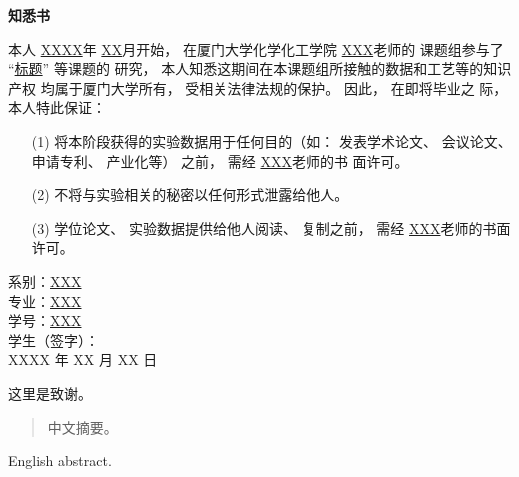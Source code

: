 \documentclass{xmu}
\begin{document}
\vspace*{-2.45em}
\pagestyle{plain}
\begin{center}
    \bf\songti{}知\quad 悉\quad 书
\end{center}
\vspace{1.5em}
{
    \renewcommand{\baselinestretch}{2}
    \par 
本人 \underline{XXXX}年 \underline{XX}月开始， 在厦门大学化学化工学院 \underline{XXX}老师的
课题组参与了 “\underline{标题}” 等课题的
研究， 本人知悉这期间在本课题组所接触的数据和工艺等的知识产权
均属于厦门大学所有， 受相关法律法规的保护。 因此， 在即将毕业之
际， 本人特此保证：
\begin{enumerate}
    \item [(1)]将本阶段获得的实验数据用于任何目的（如： 发表学术论文、
    会议论文、 申请专利、 产业化等） 之前， 需经 \underline{XXX}老师的书
    面许可。
    \item [(2)]不将与实验相关的秘密以任何形式泄露给他人。
    \item [(3)]学位论文、 实验数据提供给他人阅读、 复制之前， 需经 \underline{XXX}老师的书面许可。
\end{enumerate}

\vspace{1cm}
\begin{flushleft}
    \hspace{19em}系别：\underline{XXX\quad\quad\quad\quad}\\
    \hspace{19em}专业：\underline{XXX\quad\quad\quad\quad\quad}\\
    \hspace{19em}学号：\underline{XXX}\\
    \hspace{19em}学生（签字）：\\
    \hspace{22em}XXXX 年 XX 月 XX 日
\end{flushleft}
}
\clearpage

\thispagestyle{plain}

\blankpagetitle

\begin{acknowledgement}
这里是致谢。
\end{acknowledgement}
\blankpagetitle
\begin{abstract}
中文摘要。
\end{abstract}
\blankpagetitle
\begin{enabstract}
English abstract.
\end{enabstract}
\end{document}
